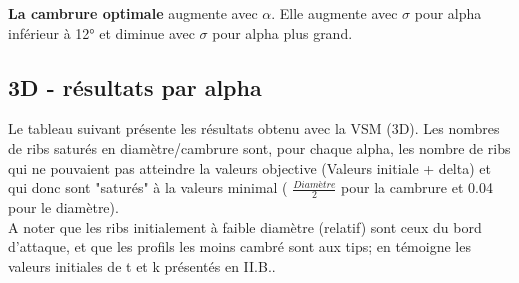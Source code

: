 \documentclass[conference]{IEEEtran}
\begin{document}
\textbf{La cambrure optimale} augmente avec $\alpha$. Elle augmente avec $\sigma$ pour alpha inférieur à 12° et diminue avec $\sigma$ pour alpha plus grand.

\subsection{3D - résultats par alpha}

Le tableau suivant présente les résultats obtenu avec la VSM (3D). Les nombres de ribs saturés en diamètre/cambrure sont, pour chaque alpha, les nombre de ribs qui ne pouvaient pas atteindre la valeurs objective (Valeurs initiale + delta) et qui donc sont "saturés" à la valeurs minimal ( $\frac{Diamètre}{2}$ pour la cambrure et 0.04 pour le diamètre).\\

A noter que les ribs initialement à faible diamètre (relatif) sont ceux du bord d'attaque, et que les profils les moins cambré sont aux tips; en témoigne les valeurs initiales de t et k présentés en II.B..
\end{document}

